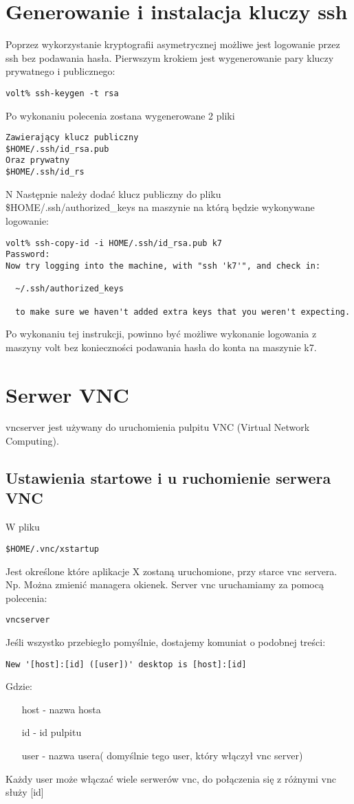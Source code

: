 \documentclass[a4paper,11pt,notitlepage]{article}
\begin{document}
\section{Generowanie i instalacja kluczy ssh}
Poprzez wykorzystanie kryptografii asymetrycznej możliwe jest logowanie przez ssh bez podawania hasła. Pierwszym krokiem jest wygenerowanie pary kluczy prywatnego i publicznego:
\begin{verbatim}
volt% ssh-keygen -t rsa
\end{verbatim}
Po wykonaniu polecenia zostana wygenerowane 2 pliki
\begin{verbatim}
Zawierający klucz publiczny
$HOME/.ssh/id_rsa.pub
Oraz prywatny
$HOME/.ssh/id_rs
\end{verbatim}
N
Następnie należy dodać klucz publiczny do pliku \$HOME/.ssh/authorized\_keys na maszynie na którą będzie wykonywane logowanie:
\begin{verbatim}
volt% ssh-copy-id -i HOME/.ssh/id_rsa.pub k7
Password:
Now try logging into the machine, with "ssh 'k7'", and check in:

  ~/.ssh/authorized_keys

  to make sure we haven't added extra keys that you weren't expecting.
\end{verbatim}
Po wykonaniu tej instrukcji, powinno być możliwe wykonanie logowania z maszyny volt bez konieczności podawania hasła do konta na maszynie k7.

\section{Serwer VNC}
vncserver  jest  używany  do uruchomienia pulpitu VNC (Virtual Network 
Computing).
\subsection{Ustawienia startowe i u ruchomienie serwera VNC}
W pliku
\begin{verbatim}
$HOME/.vnc/xstartup
\end{verbatim}
Jest określone które aplikacje X zostaną uruchomione, przy starce vnc 
servera.
Np. Można zmienić managera okienek.
Server vnc uruchamiamy za pomocą polecenia:
\begin{verbatim}
vncserver
\end{verbatim}
Jeśli wszystko przebiegło pomyślnie, dostajemy komuniat o podobnej treści:
\begin{verbatim}
New '[host]:[id] ([user])' desktop is [host]:[id]
\end{verbatim}
Gdzie:
\begin{itemize}
\item [host] - nazwa hosta
\item [id] - id pulpitu
\item [user] - nazwa usera( domyślnie tego user, który włączył vnc server)
\end{itemize}
Każdy user może włączać wiele serwerów vnc, do połączenia się z różnymi 
vnc służy [id]\newline
\end{document}
